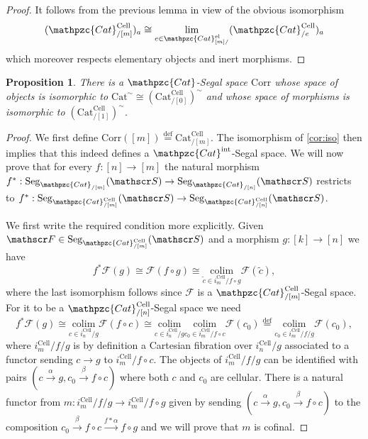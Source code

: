 \documentclass[a4paper, reqno]{amsart}
\newtheorem{prop}[theorem]{Proposition}
\theoremstyle{definition}
\newcommand\cF{\mathscr F}
\newcommand\cS{\mathscr S}
\newcommand\ccat{\mathpzc{Cat}}
\newcommand\colim{\mathrm{colim}}
\newcommand\bydef{\overset{\mathrm{def}}{=}}
\newcommand\inrt{\mathrm{int}}
\newcommand\seg{\mathrm{Seg}}
\newcommand{\mElo}[2]{\mathpzc{#1}^{\mathrm{el}}_{#2/}}
\begin{document}
\begin{proof}
It follows from the previous lemma in view of the obvious isomorphism
\begin{equation}\label{eq:one}
    (\mathpzc{Cat}^{\mathrm{Cell}}_{/[m]})_a\cong\underset{e\in\mElo{Cat}{[m]}}{\lim}(\mathpzc{Cat}^{\mathrm{Cell}}_{/e})_a
\end{equation}
which moreover respects elementary objects and inert morphisms.
\end{proof}
\begin{prop}\label{prop:corr}
There is a $\mathpzc{Cat}$-Segal space $\mathrm{Corr}$ whose space of objects is isomorphic to $\mathrm{Cat}^\sim\cong(\mathrm{Cat}^{\mathrm{Cell}}_{/[0]})^\sim$ and whose space of morphisms is isomorphic to $(\mathrm{Cat}^{\mathrm{Cell}}_{/[1]})^\sim$.
\end{prop}
\begin{proof}
We first define $\mathrm{Corr}([m])\bydef\mathrm{Cat}^{\mathrm{Cell}}_{/[m]}$. The isomorphism of \cref{cor:iso} then implies that this indeed defines a $\mathpzc{Cat}^\inrt$-Segal space. We will now prove that for every $f:[n]\rightarrow[m]$ the natural morphism $f^*:\seg_{\ccat_{/[m]}}(\cS)\rightarrow\seg_{\ccat_{/[n]}}(\cS)$ restricts to $f^*:\mathrm{Seg}_{\mathpzc{Cat}^\mathrm{Cell}_{/[m]}}(\cS)\rightarrow\mathrm{Seg}_{\mathpzc{Cat}^\mathrm{Cell}_{/[n]}}(\cS)$.\par
We first write the required condition more explicitly. Given $\cF\in\mathrm{Seg}_{\mathpzc{Cat}^\mathrm{Cell}_{/[m]}}(\cS)$ and a morphism $g:[k]\rightarrow[n]$ we have
\[f^*\cF(g)\cong\cF(f\circ g)\cong\underset{\widetilde{c}\in i_m^\mathrm{Cell}/f\circ g}{\colim}\cF(\widetilde{c}),\]
where the last isomorphism follows since $\cF$ is a $\mathpzc{Cat}^\mathrm{Cell}_{/[m]}$-Segal space. For it to be a $\mathpzc{Cat}^\mathrm{Cell}_{/[n]}$-Segal space we need
\[f^*\cF(g)\cong\underset{c\in i_n^\mathrm{Cell}/g}{\colim}\cF(f\circ c)\cong\underset{c\in i_n^\mathrm{Cell}/g}{\colim}\underset{c_0\in i_m^\mathrm{Cell}/f\circ c}{\colim}\cF(c_0)\bydef\underset{c_0\in i_m^\mathrm{Cell}/f/g}{\colim}\cF(c_0),\]
where $i_m^\mathrm{Cell}/f/g$ is by definition a Cartesian fibration over $i_n^\mathrm{Cell}/g$ associated to a functor sending $c\rightarrow g$ to $i_m^\mathrm{Cell}/f\circ c$. The objects of $i_m^\mathrm{Cell}/f/g$ can be identified with pairs $(c\xrightarrow{\alpha} g,c_0\xrightarrow{\beta} f\circ c)$ where both $c$ and $c_0$ are cellular. There is a natural functor from $m:i_m^\mathrm{Cell}/f/g\rightarrow i_m^\mathrm{Cell}/f\circ g$ given by sending $(c\xrightarrow{\alpha} g,c_0\xrightarrow{\beta} f\circ c)$ to the composition $c_0\xrightarrow{\beta}f\circ c\xrightarrow{f*\alpha}f\circ g$ and we will prove that $m$ is cofinal.\par

\end{proof}
\end{document}
